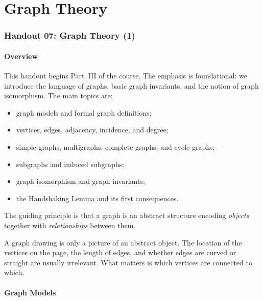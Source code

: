 \part{Graph Theory}
\section{Handout 07: Graph Theory (1)}

\subsection{Overview}

This handout begins Part~III of the course. The emphasis is foundational: we introduce the language of graphs, basic graph invariants, and the notion of graph isomorphism. The main topics are:
\begin{itemize}[leftmargin=*]
    \item graph models and formal graph definitions;
    \item vertices, edges, adjacency, incidence, and degree;
    \item simple graphs, multigraphs, complete graphs, and cycle graphs;
    \item subgraphs and induced subgraphs;
    \item graph isomorphism and graph invariants;
    \item the Handshaking Lemma and its first consequences.
\end{itemize}

The guiding principle is that a graph is an abstract structure encoding \emph{objects} together with \emph{relationships} between them.

\begin{examtip}[title={Main mindset for Handout 07}]
A graph drawing is only a picture of an abstract object. The location of the vertices on the page, the length of edges, and whether edges are curved or straight are usually irrelevant. What matters is which vertices are connected to which.
\end{examtip}

\subsection{Graph Models}

